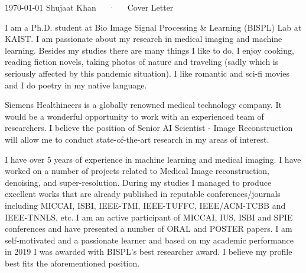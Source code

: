 \documentclass[11pt, a4paper]{awesome-cv}
\begin{document}
\makecvheader[R]

\makecvfooter
  {\today}
  {Shujaat Khan~~~·~~~Cover Letter}
  {}

\makelettertitle

\begin{cvletter}

I am a Ph.D. student at Bio Image Signal Processing & Learning (BISPL) Lab at KAIST. I am passionate about my research in medical imaging and machine learning. Besides my studies there are many things I like to do, I enjoy cooking, reading fiction novels, taking photos of nature and traveling (sadly which is seriously affected by this pandemic situation). I like romantic and sci-fi movies and I do poetry in my native language.

Siemens Healthineers is a globally renowned medical technology company. It would be a wonderful opportunity to work with an experienced team of researchers. I believe the position of Senior AI Scientist - Image Reconstruction will allow me to conduct state-of-the-art research in my areas of interest.

I have over 5 years of experience in machine learning and medical imaging. I have worked on a number of projects related to Medical Image reconstruction, denoising, and super-resolution. During my studies I managed to produce excellent works that are already published in reputable conferences/journals including MICCAI, ISBI, IEEE-TMI, IEEE-TUFFC, IEEE/ACM-TCBB and IEEE-TNNLS, etc. I am an active participant of MICCAI, IUS, ISBI and SPIE conferences and have presented a number of ORAL and POSTER papers. I am self-motivated and a passionate learner and based on my academic performance in 2019 I was awarded with BISPL's best researcher award. I believe my profile best fits the aforementioned position.

\end{cvletter}


\makeletterclosing
\end{document}
